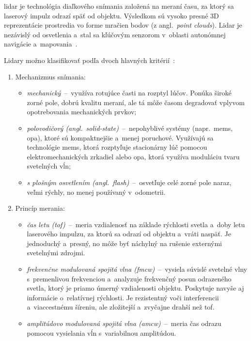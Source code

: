      \acrfull{lidar} je technológia diaľkového snímania založená na meraní času, za ktorý sa laserový impulz odrazí späť od objektu. Výsledkom sú vysoko presné 3D reprezentácie prostredia vo forme mračien bodov (z angl.\ \textit{point clouds})\@. Lidar je nezávislý od osvetlenia a~stal sa kľúčovým senzorom v~oblasti autonómnej navigácie a~mapovania~\cite{leeLiDAROdometrySurvey2024}.

      Lidary možno klasifikovať podľa dvoch hlavných kritérií~\cite{leeLiDAROdometrySurvey2024}:
        \begin{enumerate}
          \item Mechanizmus snímania:
          \begin{itemize}
            \item \emph{mechanický}~--~využíva rotujúce časti na rozptyl lúčov. Ponúka široké zorné pole, dobrú kvalitu meraní, ale tá môže časom degradovať vplyvom opotrebovania mechanických prvkov;
            \item \emph{polovodičový (angl.\ solid-state)}~--~nepohyblivé systémy (napr.\ \acrshort{mems}, \acrshort{opa}), ktoré sú kompaktnejšie a~menej poruchové. Využívajú sa technológie \acrshort{mems}, ktorá rozptyľuje stacionárny lúč pomocou elektromechanických zrkadiel alebo \acrshort{opa}, ktorá využíva moduláciu tvaru svetelných vĺn;
            \item \emph{s plošným osvetlením (angl.\ flash)}~--~osvetľuje celé zorné pole naraz, veľmi rýchly, no menej používaný v~odometrii.
          \end{itemize}

          \item Princíp merania:
          \begin{itemize}
            \item \emph{čas letu (\acrshort{tof})}~--~meria vzdialenosť na základe rýchlosti svetla a~doby letu laserového impulzu, za ktorú sa odrazí od objektu a~vráti naspäť. Je jednoduchý a~presný, no môže byť náchylný na rušenie externými svetelnými zdrojmi.
            \item \emph{frekvenčne modulovaná spojitá vlna (\acrshort{fmcw})}~--~vysiela súvislé svetelné vlny s~premenlivou frekvenciou a~analyzuje frekvenčný posun odrazeného svetla, ktorý je priamo úmerný vzdialenosti objektu. Poskytuje navyše aj informácie o~relatívnej rýchlosti. Je rezistentný voči interferencii a~viaccestnému šíreniu, ale zložitejší a~zvyčajne drahší než \acrshort{tof}.
            \item \emph{amplitúdovo modulovaná spojitá vlna (\acrshort{amcw})}~--~meria čas odrazu pomocou vysielania vĺn s~variabilnou amplitúdou.
          \end{itemize}
        \end{enumerate}

